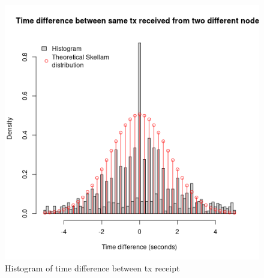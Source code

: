 \documentclass[usletter,11pt,english,openany]{article}
\begin{document}
\begin{figure}[H]
\caption{Histogram of time difference between tx receipt}
\label{fig-skellam-histogram-tx-p2p-msg}
\centering{}\includegraphics[scale=0.5]{images/skellam-histogram-tx-p2p-msg}
\end{figure}



\end{document}
